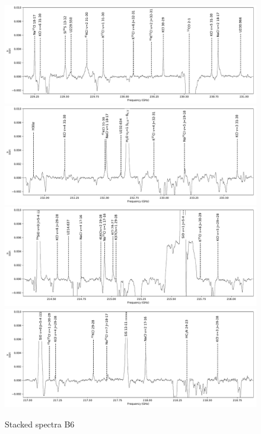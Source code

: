\documentclass[12pt]{article}
\begin{document}
\begin{figure}[!htp]
\includegraphics[scale=1,width=5.5in]{figures/lines_labeled_OrionSourceI_B6_spw0_robust0.5.pdf}
\includegraphics[scale=1,width=5.5in]{figures/lines_labeled_OrionSourceI_B6_spw1_robust0.5.pdf}
\includegraphics[scale=1,width=5.5in]{figures/lines_labeled_OrionSourceI_B6_spw2_robust0.5.pdf}
\includegraphics[scale=1,width=5.5in]{figures/lines_labeled_OrionSourceI_B6_spw3_robust0.5.pdf}
\caption{Stacked spectra B6}
\label{fig:spectrab6}
\end{figure}
\end{document}
